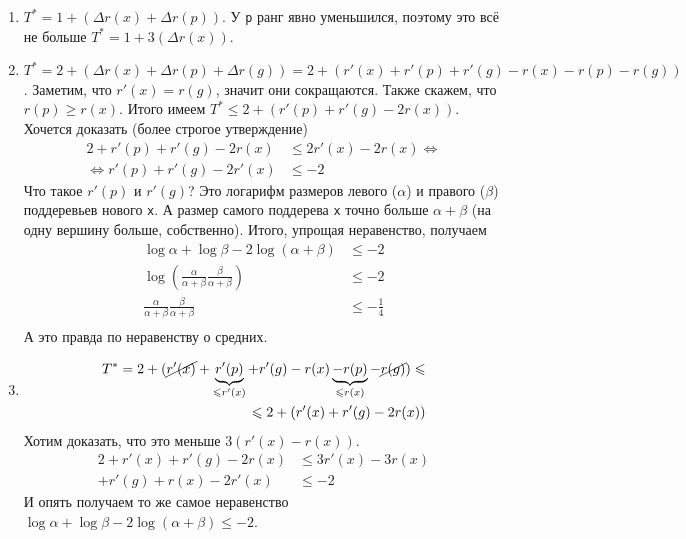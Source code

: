 \documentclass{article}
\newcommand{\pseudo}{PseudoLexer.py:PseudoLexer -x}
\newcommand{\pseudocode}[1]{\texttt{#1}}
\begin{document}
    \begin{enumerate}
        \item $T^*=1+(\Delta r(x)+\Delta r(p))$. У \pseudocode{p} ранг явно уменьшился, поэтому это всё не больше $T^*=1+3(\Delta r(x))$.
        \item $T^*=2+(\Delta r(x)+\Delta r(p)+\Delta r(g))=2+(r'(x)+r'(p)+r'(g)-r(x)-r(p)-r(g))$. Заметим, что $r'(x)=r(g)$, значит они сокращаются. Также скажем, что $r(p)\geqslant r(x)$. Итого имеем $T^*\leqslant2+(r'(p)+r'(g)-2r(x))$. Хочется доказать (более строгое утверждение)
        \[
        \begin{split}
            2+r'(p)+r'(g)-2r(x)&\leqslant2r'(x)-2r(x)\Leftrightarrow\\
            \Leftrightarrow r'(p)+r'(g)-2r'(x)&\leqslant-2
        \end{split}
        \]
        Что такое $r'(p)$ и $r'(g)$? Это логарифм размеров левого ($\alpha$) и правого ($\beta$) поддеревьев нового \pseudocode{x}. А размер самого поддерева \pseudocode{x} точно больше $\alpha+\beta$ (на одну вершину больше, собственно). Итого, упрощая неравенство, получаем
        \[
        \begin{split}
            \log\alpha+\log\beta-2\log(\alpha+\beta)&\leqslant-2\\
            \log\left(\frac{\alpha}{\alpha+\beta}\frac{\beta}{\alpha+\beta}\right)&\leqslant-2\\
            \frac{\alpha}{\alpha+\beta}\frac{\beta}{\alpha+\beta}&\leqslant-\frac14\\
        \end{split}
        \]
        А это правда по неравенству о средних.
        \item
        \[\begin{split}
            T^*=2+(\cancel{r'(x)}+\underbrace{r'(p)}_{\leqslant r'(x)}+r'(g)-r(x)\underbrace{-r(p)}_{\leqslant r(x)}-\cancel{r(g)})\leqslant\\
            \leqslant2+(r'(x)+r'(g)-2r(x))
        \end{split}\]
        Хотим доказать, что это меньше $3(r'(x)-r(x))$.
        \[\begin{split}
            2+r'(x)+r'(g)-2r(x)&\leqslant3r'(x)-3r(x)\\
            +r'(g)+r(x)-2r'(x)&\leqslant-2
        \end{split}\]
        И опять получаем то же самое неравенство $\log\alpha+\log\beta-2\log(\alpha+\beta)\leqslant-2$.
    \end{enumerate}
\end{document}
